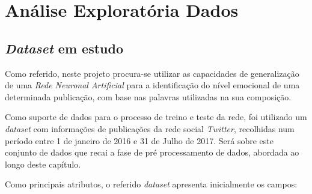 \chapter{Análise Exploratória Dados}
\label{chp:AnaliseDados}

\section{\textit{Dataset} em estudo}
\label{sec:DatasetEstudo}

Como referido, neste projeto procura-se utilizar as capacidades de generalização de uma \textit{Rede Neuronal Artificial} para a identificação do nível emocional de uma determinada publicação, com base nas palavras utilizadas na sua composição.  

Como suporte de dados para o processo de treino e teste da rede, foi utilizado um \textit{dataset} com informações de publicações da rede social \textit{Twitter}, recolhidas num período entre 1 de janeiro de 2016 e 31 de Julho de 2017. 
Será sobre este conjunto de dados que recai a fase de pré processamento de dados, abordada ao longo deste capítulo.

Como principais atributos, o referido \textit{dataset} apresenta inicialmente os campos:

